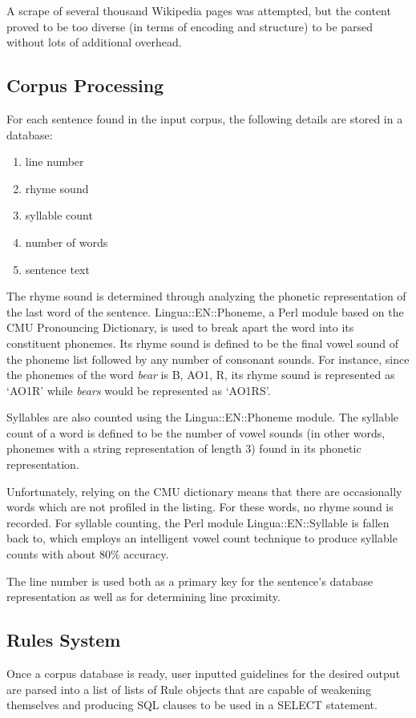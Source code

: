 \documentclass[10pt]{article}
\begin{document}
A scrape of several thousand Wikipedia pages was attempted, but the content
proved to be too diverse (in terms of encoding and structure) to be parsed
without lots of additional overhead.

\subsection{Corpus Processing}
For each sentence found in the input corpus, the following details are stored in a database:
\onehalfspacing
\begin{enumerate}
\item line number
\item rhyme sound
\item syllable count
\item number of words
\item sentence text
\end{enumerate}
\doublespacing

The rhyme sound is determined through analyzing the phonetic representation of
the last word of the sentence. Lingua::EN::Phoneme, a Perl module based on the
CMU Pronouncing Dictionary, is used to break apart the word into its
constituent phonemes. Its rhyme sound is defined to be the final vowel sound of
the phoneme list followed by any number of consonant sounds. For instance,
since the phonemes of the word \emph{bear} is B, AO1, R, its rhyme sound is
represented as `AO1R' while \emph{bears} would be represented as `AO1RS'.

Syllables are also counted using the Lingua::EN::Phoneme module. The syllable
count of a word is defined to be the number of vowel sounds (in other words,
phonemes with a string representation of length 3) found in its phonetic
representation.

Unfortunately, relying on the CMU dictionary means that there are occasionally
words which are not profiled in the listing. For these words, no rhyme sound is
recorded. For syllable counting, the Perl module Lingua::EN::Syllable is fallen
back to, which employs an intelligent vowel count technique to produce syllable
counts with about 80\% accuracy.

The line number is used both as a primary key for the sentence's database
representation as well as for determining line proximity.

\subsection{Rules System}
Once a corpus database is ready, user inputted guidelines for the desired
output are parsed into a list of lists of Rule objects that are capable of
weakening themselves and producing SQL clauses to be used in a SELECT
statement.
\end{document}
